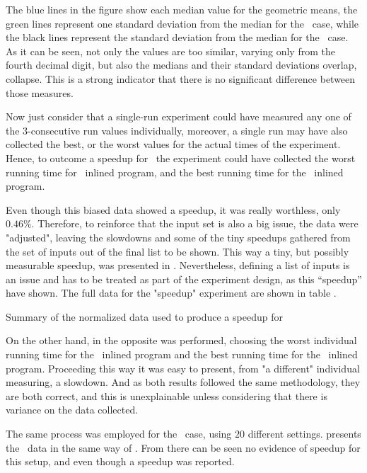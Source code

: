 The blue lines in the figure show each median value for the geometric means, the green lines represent one standard deviation from the median for the \FDI\ case, while the black lines represent the standard deviation from the median for the \llvm\ case. As it can be seen, not only the values are too similar, varying only from the fourth decimal digit, but also the medians and their standard deviations overlap, collapse. This is a strong indicator that there is no significant difference between those measures.

Now just consider that a single-run experiment could have measured any one of the $3$-consecutive run values individually, moreover, a single run may have also collected the best, or the worst values for the actual times of the experiment. Hence, to outcome a speedup for \FDI\, the experiment could have collected the worst running time for \llvm\ inlined program, and the best running time for the \FDI\ inlined program.

Even though this biased data showed a speedup, it was really worthless, only $0.46 \%$. Therefore, to reinforce that the input set is also a big issue, the data were "adjusted", leaving the slowdowns and some of the tiny speedups gathered from the set of inputs out of the final list to be shown. This way a tiny, but possibly measurable speedup, was presented in . Nevertheless, defining a list of inputs is an issue and has to be treated as part of the experiment design, as this ``speedup'' have shown. The full data for the "speedup" experiment are shown in table .

\begin{table}
  \centering
  \begin{tiny}
  
  \end{tiny}
  \caption{Summary of the normalized data used to produce a speedup for \bzip}
  \label{tab:fullexp}
\end{table}

On the other hand, in  the opposite was performed, choosing the worst individual running time for the \FDI\ inlined program and the best running time for the \llvm\ inlined program. Proceeding this way it was easy to present, from "a different" individual measuring, a slowdown. And as both results followed the same methodology, they are both correct, and this is unexplainable unless considering that there is variance on the data collected.

The same process was employed for the \gzip\ case, using $20$ different settings.  presents the \gzip\ data in the same way of . From  there can be seen no evidence of speedup for this setup, and even though a speedup was reported.

